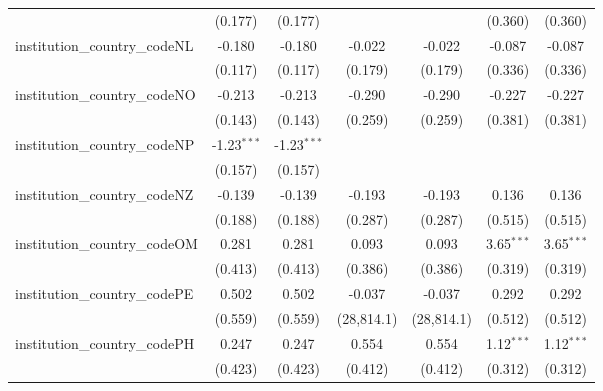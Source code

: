 \begin{tabular}{lcccccc}
                                         & (0.177)        & (0.177)        &                &                & (0.360)        & (0.360)\\   
   institution\_country\_codeNL          & -0.180         & -0.180         & -0.022         & -0.022         & -0.087         & -0.087\\   
                                         & (0.117)        & (0.117)        & (0.179)        & (0.179)        & (0.336)        & (0.336)\\   
   institution\_country\_codeNO          & -0.213         & -0.213         & -0.290         & -0.290         & -0.227         & -0.227\\   
                                         & (0.143)        & (0.143)        & (0.259)        & (0.259)        & (0.381)        & (0.381)\\   
   institution\_country\_codeNP          & -1.23$^{***}$  & -1.23$^{***}$  &                &                &                &   \\   
                                         & (0.157)        & (0.157)        &                &                &                &   \\   
   institution\_country\_codeNZ          & -0.139         & -0.139         & -0.193         & -0.193         & 0.136          & 0.136\\   
                                         & (0.188)        & (0.188)        & (0.287)        & (0.287)        & (0.515)        & (0.515)\\   
   institution\_country\_codeOM          & 0.281          & 0.281          & 0.093          & 0.093          & 3.65$^{***}$   & 3.65$^{***}$\\   
                                         & (0.413)        & (0.413)        & (0.386)        & (0.386)        & (0.319)        & (0.319)\\   
   institution\_country\_codePE          & 0.502          & 0.502          & -0.037         & -0.037         & 0.292          & 0.292\\   
                                         & (0.559)        & (0.559)        & (28,814.1)     & (28,814.1)     & (0.512)        & (0.512)\\   
   institution\_country\_codePH          & 0.247          & 0.247          & 0.554          & 0.554          & 1.12$^{***}$   & 1.12$^{***}$\\   
                                         & (0.423)        & (0.423)        & (0.412)        & (0.412)        & (0.312)        & (0.312)\\   

\end{tabular}
